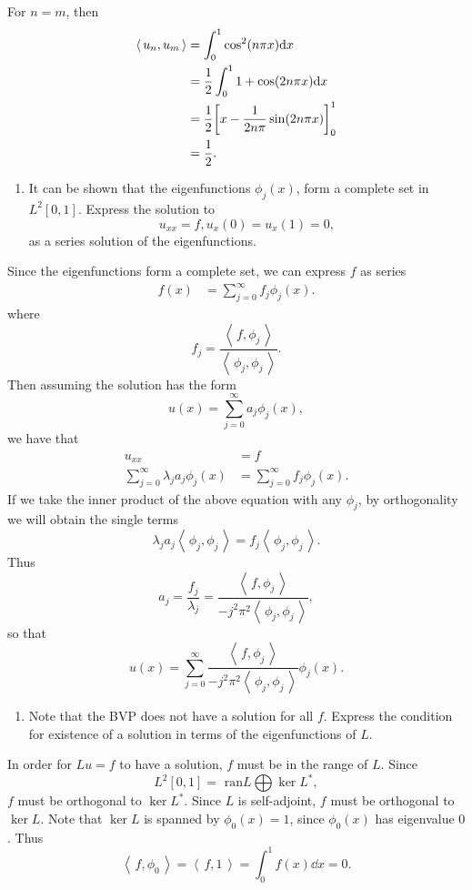\documentclass[12pt]{article}
\newcommand{\inpd}[1]{{\left< \, #1 \, \right>}}
\def\ran{\text{ ran}}
\begin{document}
For $n=m$, then \begin{align*}
\inpd{u_n, u_m} &= \int_0^1 \cos^2(n \pi x)\dd x \\
&= \frac{1}{2}\int_0^1 1+\cos(2n\pi x) \dd x \\
&= \frac{1}{2} \qty[ x -\frac{1}{2n\pi} \sin(2n\pi x)]_0^1 \\
&= \frac{1}{2}.
\end{align*}

\begin{enumerate}[ \ \ (c)]
\item It can be shown that the eigenfunctions $\phi_j(x)$, form a complete set in $L^2[0,1]$. Express the solution to $$u_{xx} = f, u_x(0)=u_x(1) = 0,$$ as a series solution of the eigenfunctions.
\end{enumerate}
Since the eigenfunctions form a complete set, we can express $f$ as series
\begin{align*}
f(x) &= \sum_{j=0}^\infty f_j \phi_j(x).
\end{align*}
where $$f_j = \dfrac{\inpd{f, \phi_j}}{ \inpd{\phi_j, \phi_j}}.$$
Then assuming the solution has the form $$u(x) = \sum_{j=0}^\infty a_j \phi_j(x),$$
we have that 
\begin{align*}
u_{xx} &= f \\
\sum_{j=0}^\infty \lambda_j a_j \phi_j(x) &= \sum_{j=0}^\infty f_j \phi_j(x).
\end{align*}
If we take the inner product of the above equation with any $\phi_j$, by orthogonality we will obtain the single terms
$$\lambda_j a_j \inpd{\phi_j, \phi_j} = f_j \inpd{\phi_j, \phi_j}.$$
Thus $$a_j = \dfrac{f_j}{\lambda_j} = \dfrac{\inpd{f, \phi_j}}{ -j^2\pi^2 \inpd{\phi_j, \phi_j}},$$
so that $$u(x) = \sum_{j=0}^\infty  \dfrac{\inpd{f, \phi_j}}{ -j^2\pi^2 \inpd{\phi_j, \phi_j}} \phi_j(x).$$

\begin{enumerate}[ \ \ (d)]
\item Note that the BVP does not have a solution for all $f$.  Express the condition for existence of a solution in terms of the eigenfunctions of $L$.
\end{enumerate}

In order for $Lu = f$ to have a solution, $f$ must be in the range of $L$.  Since $$L^2[0,1] = \ran{L} \bigoplus \ker{L^*},$$ $f$ must be orthogonal to $\ker{L^*}$.  Since $L$ is self-adjoint, $f$ must be orthogonal to $\ker{L}$.  Note that $\ker{L}$ is spanned by $\phi_0(x) = 1$, since $\phi_0(x)$ has eigenvalue $0$.  Thus 
$$\inpd{f,\phi_0} = \inpd{f,1} = \int_0^1 f(x) \dd x = 0.$$
\end{document}
